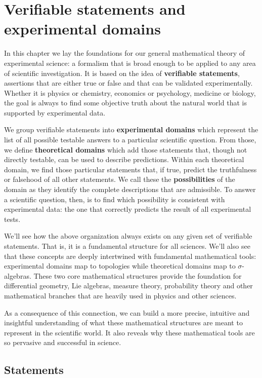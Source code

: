 \documentclass[11pt,letterpaper,fleqn]{memoir} %
\begin{document}
\chapter{Verifiable statements and experimental domains}

In this chapter we lay the foundations for our general mathematical theory of experimental science: a formalism that is broad enough to be applied to any area of scientific investigation. It is based on the idea of \textbf{verifiable statements}, assertions that are either true or false and that can be validated experimentally. Whether it is physics or chemistry, economics or psychology, medicine or biology, the goal is always to find some objective truth about the natural world that is supported by experimental data.

We group verifiable statements into \textbf{experimental domains} which represent the list of all possible testable answers to a particular scientific question. From those, we define \textbf{theoretical domains} which add those statements that, though not directly testable, can be used to describe predictions. Within each theoretical domain, we find those particular statements that, if true, predict the truthfulness or falsehood of all other statements. We call these the \textbf{possibilities} of the domain as they identify the complete descriptions that are admissible. To answer a scientific question, then, is to find which possibility is consistent with experimental data: the one that correctly predicts the result of all experimental tests.

We'll see how the above organization always exists on any given set of verifiable statements. That is, it is a fundamental structure for all sciences. We'll also see that these concepts are deeply intertwined with fundamental mathematical tools: experimental domains map to topologies while theoretical domains map to $\sigma$-algebras. These two core mathematical structures provide the foundation for differential geometry, Lie algebras, measure theory, probability theory and other mathematical branches that are heavily used in physics and other sciences.

As a consequence of this connection, we can build a more precise, intuitive and insightful understanding of what these mathematical structures are meant to represent in the scientific world. It also reveals why these mathematical tools are so pervasive and successful in science.

\section{Statements}
\end{document}
